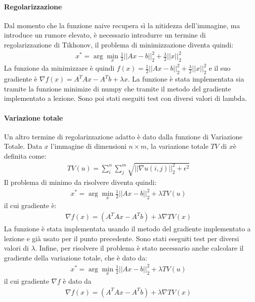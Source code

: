 \documentclass[12pt]{article}
\begin{document}
    \paragraph{Regolarizzazione}
    Dal momento che la funzione naive recupera sì la nitidezza dell'immagine, ma introduce un rumore elevato, è necessario introdurre un termine di regolarizzazione di Tikhonov, il problema di minimizzazione diventa quindi:
    \begin{align*}
        x^* = \arg\min_x \frac{1}{2} ||Ax - b||_2^2 + \frac{\lambda}{2} ||x||_2^2
    \end{align*}
    La funzione da minimizzare è quindi $f(x) = \frac{1}{2} ||Ax - b||_2^2 + \frac{\lambda}{2} ||x||_2^2$ e il suo gradiente è $\nabla f(x) = A^TAx - A^Tb + \lambda x$.
    La funzione è stata implementata sia tramite la funzione minimize di numpy che tramite il metodo del gradiente implementato a lezione. Sono poi stati eseguiti test con diversi valori di lambda.
    
    \paragraph{Variazione totale}
    Un altro termine di regolarizzazione adatto è dato dalla funzione di Variazione Totale. Data $x$ l'immagine di dimensioni $n\times m$, la variazione totale $TV$ di $x$è definita come:
    \begin{align*}
        TV(u) = \sum_i^n{\sum_j^m{\sqrt{||\nabla u(i, j)||_2^2 + \epsilon^2}}}
    \end{align*}
    Il problema di minimo da risolvere diventa quindi:
    \begin{align*}
        x^* = \arg\min_x \frac{1}{2} ||Ax - b||_2^2 + \lambda TV(u)
    \end{align*}
    il cui gradiente è:
    \begin{align*}
    \nabla f(x) = (A^TAx - A^Tb)  + \lambda \nabla TV(x)
    \end{align*}
    La funzione è stata implementata usando il metodo del gradiente implementato a lezione e già usato per il punto precedente. Sono stati eseguiti test per diversi valori di $\lambda$.
    Infine, per risolvere il problema è stato necessario anche calcolare il gradiente della variazione totale, che è dato da:
    \begin{align*}
        x^* = \arg\min_x \frac{1}{2} ||Ax - b||_2^2 + \lambda TV(u)
    \end{align*}
    il cui gradiente $\nabla f$ è dato da
    \begin{align*}
        \nabla f(x) = (A^TAx - A^Tb)  + \lambda \nabla TV(x)
    \end{align*}
    
\end{document}
